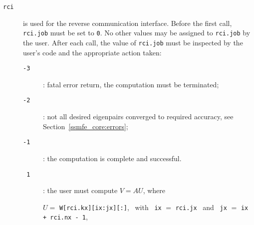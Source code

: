 \begin{description}
%
\item[\texttt{rci}] is used for the reverse communication interface.
Before the first call, {\tt rci.job} must be set to {\tt 0}.
No other values may be assigned to {\tt rci.job} by the user.
After each call,
the value of {\tt rci.job} must be inspected by the user's code
and the appropriate action taken: 
\begin{description}
%
\item[\texttt{-3}]: fatal error return, the computation must be terminated;
%
\item[\texttt{-2}]: 
not all desired eigenpairs converged to required accuracy,
see Section~\ref{ssmfe_core:errors};
%
\item[\texttt{-1}]: the computation is complete and successful.
%
\item[\texttt{~1}]: the user must compute $V = A U$, where

\hspace{8mm}
$U=$ {\tt W[rci.kx][ix:jx][:]}, 
~with~ {\tt ix} $=$ {\tt rci.jx} 
~and~
{\tt jx} $=$ {\tt ix + rci.nx - 1},


\end{description}
\end{description}
